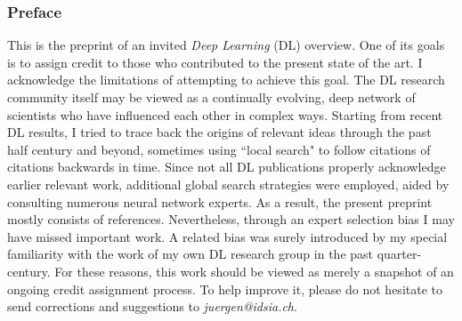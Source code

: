\documentclass[letterpaper]{article}
\begin{document}
\begin{CJK*}{UTF8}{gbsn}
\vspace{1cm}
\subsubsection*{Preface}
\label{foreword}
This is the preprint of an invited {\em Deep Learning} (DL) overview. One of its goals is to assign credit to those who contributed to the present state of the art. I acknowledge the limitations of attempting to achieve this goal. The DL research community itself may be viewed as a continually evolving, deep network of scientists who have influenced each other in complex ways. Starting from recent DL results, I tried to trace back the origins of relevant ideas through the past half century and beyond, sometimes using ``local search" to follow citations of citations  backwards in time. Since not all DL publications properly acknowledge earlier relevant work, additional global search strategies were employed, aided by consulting numerous neural network experts. As a result, the present preprint mostly consists of references. Nevertheless, through an expert selection bias I may have missed important work. A related bias was surely introduced by my special familiarity with the work of my own DL research group in the past quarter-century. For these reasons, this work should be viewed as merely a snapshot of an ongoing credit assignment process. To help improve it, please do not hesitate to send corrections and  suggestions to {\em juergen@idsia.ch}.




\newpage
\tableofcontents


\end{CJK*}
\end{document}
